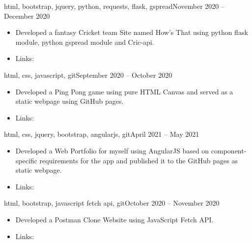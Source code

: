 \documentclass[10pt,a4paper]{altacv}
\begin{document}


{\MakeLowercase{html, Bootstrap, jquery, Python, requests, flask, gspread}}{November 2020 -- December 2020}{}
\begin{itemize}
\item Developed a fantasy Cricket team Site named How's That using python flask module, python gspread module and Cric-api.
\item Links: 
\end{itemize}
\divider

{\MakeLowercase{HTML, CSS, JavaScript, Git}}{September 2020 -- October 2020}{}
\begin{itemize}
\item Developed a Ping Pong game using pure HTML Canvas and served as a static webpage using GitHub pages.
\item Links: 
\end{itemize}
\divider

{\MakeLowercase{HTML, CSS, jQuery, Bootstrap, AngularJS, Git}}{April 2021 -- May 2021}{}
\begin{itemize}
\item Developed a Web Portfolio for myself using AngularJS based on component-specific requirements for the app and published it to the GitHub pages as static webpage.
\item Links: 
\end{itemize}
\divider



{\MakeLowercase{HTML, Bootstrap, javaScript fetch api, Git}}{October 2020 -- November 2020}{}
\begin{itemize}
\item Developed a Postman Clone Website using JavaScript Fetch API.
\item Links: 
\end{itemize}
\divider
\end{document}
